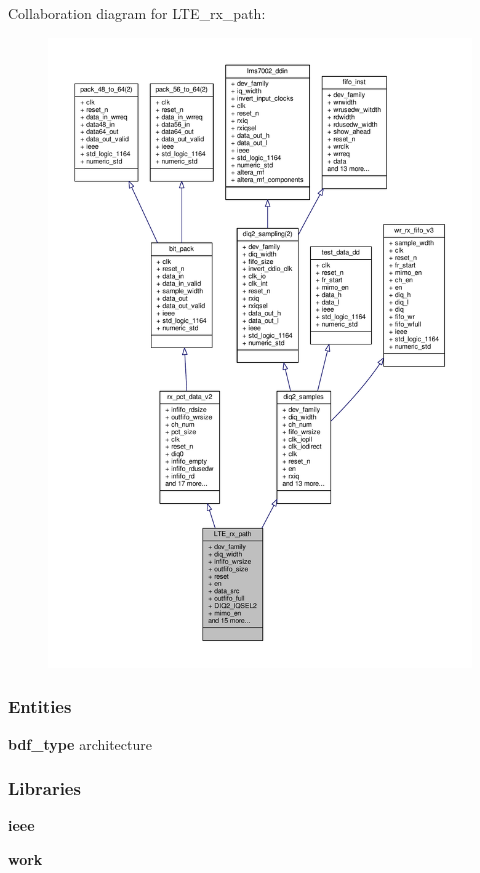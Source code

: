 Collaboration diagram for L\+T\+E\+\_\+rx\+\_\+path\+:\nopagebreak
\begin{figure}[H]
\begin{center}
\leavevmode
\includegraphics[width=350pt]{d0/d0e/classLTE__rx__path__coll__graph}
\end{center}
\end{figure}
\subsubsection*{Entities}
\begin{DoxyCompactItemize}
\item 
{\bf bdf\+\_\+type} architecture
\end{DoxyCompactItemize}
\subsubsection*{Libraries}
 \begin{DoxyCompactItemize}
\item 
{\bf ieee} 
\item 
{\bf work} 
\end{DoxyCompactItemize}
